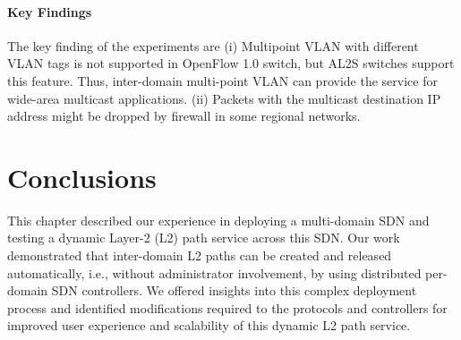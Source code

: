 \paragraph{Key Findings}
The key finding of the experiments are (i) Multipoint VLAN with different VLAN tags is not supported in OpenFlow 1.0 switch, but AL2S switches support this feature. Thus, inter-domain multi-point VLAN can provide the service for wide-area multicast applications. (ii) Packets with the multicast destination IP address might be dropped by firewall in some regional networks.


\section{Conclusions}
This chapter described our experience in deploying a multi-domain SDN and testing
a dynamic Layer-2 (L2) path service across this SDN. Our work demonstrated that inter-domain L2 paths can be created and released automatically, i.e., without administrator involvement, by using distributed per-domain SDN controllers.
We offered insights into this complex deployment process
and identified modifications required to the protocols and controllers
for improved user experience and scalability of this dynamic L2 path service.

